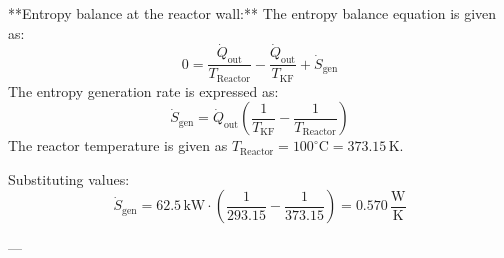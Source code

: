 **Entropy balance at the reactor wall:**  
The entropy balance equation is given as:  
\[
0 = \frac{\dot{Q}_{\text{out}}}{T_{\text{Reactor}}} - \frac{\dot{Q}_{\text{out}}}{T_{\text{KF}}} + \dot{S}_{\text{gen}}
\]  
The entropy generation rate is expressed as:  
\[
\dot{S}_{\text{gen}} = \dot{Q}_{\text{out}} \left( \frac{1}{T_{\text{KF}}} - \frac{1}{T_{\text{Reactor}}} \right)
\]  
The reactor temperature is given as \( T_{\text{Reactor}} = 100^\circ\text{C} = 373.15 \, \text{K} \).  

Substituting values:  
\[
\dot{S}_{\text{gen}} = 62.5 \, \text{kW} \cdot \left( \frac{1}{293.15} - \frac{1}{373.15} \right) = 0.570 \, \frac{\text{W}}{\text{K}}
\]  

---